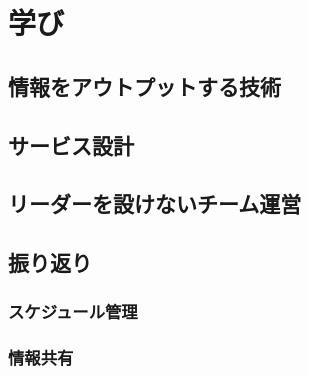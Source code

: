\chapter{学び}

\section{情報をアウトプットする技術}
\bunseki{}

\section{サービス設計}
\bunseki{}

\section{リーダーを設けないチーム運営}
\bunseki{}

\section{振り返り}
\subsection{スケジュール管理}
\bunseki{}

\subsection{情報共有}
\bunseki{}
